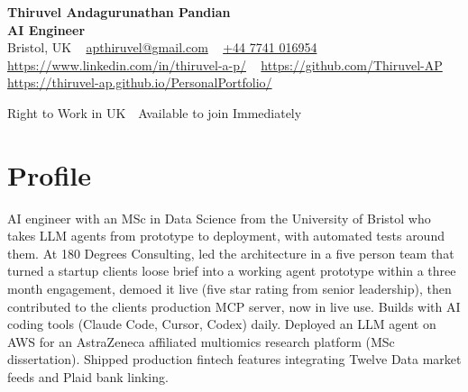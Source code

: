 \documentclass[a4paper,11pt]{article}
\begin{document}
\begin{center}
  {\LARGE\bfseries Thiruvel Andagurunathan Pandian} \\[3pt]
  {\color{headernavy}\small\textbf{AI Engineer}} \\[3pt]
  {\small
  Bristol, UK\nobreak\ \,\textbar\, \href{mailto:apthiruvel@gmail.com}{apthiruvel@gmail.com}\nobreak\ \,\textbar\, \href{tel:+447741016954}{+44 7741 016954}\nobreak\ \,\textbar\, \href{https://www.linkedin.com/in/thiruvel-a-p/}{https://www.linkedin.com/in/thiruvel-a-p/}\nobreak\ \,\textbar\, \href{https://github.com/Thiruvel-AP}{https://github.com/Thiruvel-AP}\nobreak\ \,\textbar\, \href{https://thiruvel-ap.github.io/PersonalPortfolio/}{https://thiruvel-ap.github.io/PersonalPortfolio/}}\par\vspace{4pt}
  \noindent{} Right to Work in UK \,\textbar\, Available to join Immediately
\end{center}

\section{Profile}
AI engineer with an MSc in Data Science from the University of Bristol who takes LLM agents from prototype to deployment, with automated tests around them. At 180 Degrees Consulting, led the architecture in a five person team that turned a startup client\textquotesingle{}s loose brief into a working agent prototype within a three month engagement, demoed it live (five star rating from senior leadership), then contributed to the client\textquotesingle{}s production MCP server, now in live use. Builds with AI coding tools (Claude Code, Cursor, Codex) daily. Deployed an LLM agent on AWS for an AstraZeneca affiliated multiomics research platform (MSc dissertation). Shipped production fintech features integrating Twelve Data market feeds and Plaid bank linking.
\end{document}
